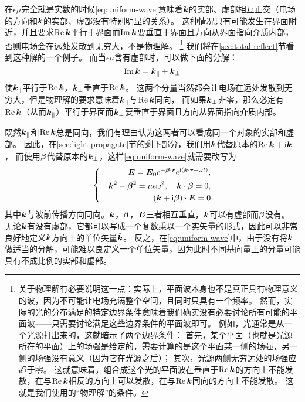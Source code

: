 \documentclass[UTF8, a4paper]{ctexart}
\newcommand*{\ii}{\mathrm{i}}
\newcommand*{\ee}{\mathrm{e}}
\begin{document}
在$\epsilon\mu$完全就是实数的时候\eqref{eq:uniform-wave}意味着$\vb*{k}$的实部、虚部相互正交（电场的方向和$\vb*{k}$的实部、虚部没有特别明显的关系）。
这种情况只有可能发生在界面附近，并且要求$\Re \vb*{k}$平行于界面而$\Im \vb*{k}$要垂直于界面且方向从界面指向介质内部，
否则电场会在远处发散到无穷大，不是物理解。%
\footnote{关于物理解有必要说明这一点：实际上，平面波本身也不是真正具有物理意义的波，因为不可能让电场充满整个空间，且同时只具有一个频率。
然而，实际的光的分布满足的特定边界条件意味着我们确实没有必要讨论所有可能的平面波——只需要讨论满足这些边界条件的平面波即可。
例如，光通常是从一个光源打出来的，这就暗示了两个边界条件：
首先，某个平面（也就是光源所在的平面）上的场强是给定的，需要计算的是这个平面某一侧的场强，另一侧的场强没有意义（因为它在光源之后）；
其次，光源两侧无穷远处的场强应趋于零。
这就意味着，组合成这个光的平面波在垂直于$\Re \vb*{k}$的方向上不能发散，在与$\Re\vb*{k}$相反的方向上可以发散，在与$\Re\vb*{k}$同向的方向上不能发散。
这就是我们使用的“物理解”的条件。
}
我们将在\ref{sec:total-reflect}节看到这种解的一个例子。
而当$\epsilon\mu$含有虚部时，可以做下面的分解：
\[
    \Im \vb*{k} = \vb*{k}_\parallel + \vb*{k}_\bot
\]
使$\vb*{k}_\parallel$平行于$\Re\vb*{k}$，$\vb*{k}_\bot$垂直于$\Re\vb*{k}$。
这两个分量当然都会让电场在远处发散到无穷大，但是物理解的要求意味着$\vb*{k}_\parallel$与$\Re \vb*{k}$同向，
而如果$\vb*{k}_\bot$非零，那么必定有$\Re \vb*{k}$（从而$\vb*{k}_\parallel$）平行于界面而$\vb*{k}_\bot$要垂直于界面且方向从界面指向介质内部。

既然$\vb*{k}_\parallel$和$\Re \vb*{k}$总是同向，我们有理由认为这两者可以看成同一个对象的实部和虚部。
因此，在\ref{sec:light-propagate}节的剩下部分，我们用$\vb*{k}$代替原本的$\Re \vb*{k} + \ii \vb*{k}_\parallel$，
而使用$\vb*{\beta}$代替原本的$\vb*{k}_\bot$，这样\eqref{eq:uniform-wave}就需要改写为
\begin{equation}
    \left\{\quad
        \begin{aligned}
            \vb*{E} = \vb*{E}_0 \ee^{- \vb*{\beta} \cdot \vb*{r}} \ee^{\ii (\vb*{k} \cdot \vb*{r} - \omega t)}, \\
            \vb*{k}^2 - \vb*{\beta}^2 = \mu\epsilon\omega^2, \quad \vb*{k} \cdot \vb*{\beta} = 0, \\
            (\vb*{k} + \ii \vb*{\beta}) \cdot \vb*{E} = 0
        \end{aligned}
    \right.
    \label{eq:beta-k-uniform-wave}
\end{equation}
其中$\vb*{k}$与波前传播方向同向。$\vb*{k}$，$\vb*{\beta}$，$\vb*{E}$三者相互垂直，$\vb*{k}$可以有虚部而$\vb*{\beta}$没有。
无论$\vb*{k}$有没有虚部，它都可以写成一个复数乘以一个实矢量的形式，因此可以非常良好地定义$\vb*{k}$方向上的单位矢量$\hat{\vb*{k}}$。
反之，在\eqref{eq:uniform-wave}中，由于没有将$\vb*{k}$做适当的分解，可能难以良定义一个单位矢量，因为此时不同基向量上的分量可能具有不成比例的实部和虚部。
\end{document}
